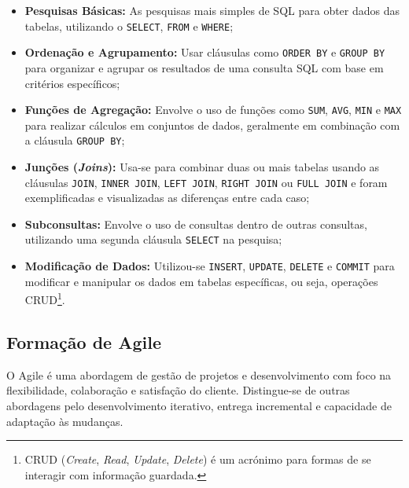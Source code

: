       \begin{itemize}
          \item \textbf{Pesquisas Básicas:} As pesquisas mais simples de SQL para obter dados das tabelas, utilizando o \texttt{SELECT}, \texttt{FROM} e \texttt{WHERE};
          
          \item \textbf{Ordenação e Agrupamento:} Usar cláusulas como \texttt{ORDER BY} e \texttt{GROUP BY} para organizar e agrupar os resultados de uma consulta SQL com base em critérios específicos;
          
          \item \textbf{Funções de Agregação:} Envolve o uso de funções como \texttt{SUM}, \texttt{AVG}, \texttt{MIN} e \texttt{MAX} para realizar cálculos em conjuntos de dados, geralmente em combinação com a cláusula \texttt{GROUP BY};
          
          \item \textbf{Junções (\textit{Joins}):} Usa-se para combinar duas ou mais tabelas usando as cláusulas \texttt{JOIN}, \texttt{INNER JOIN}, \texttt{LEFT JOIN}, \texttt{RIGHT JOIN} ou \texttt{FULL JOIN} e foram exemplificadas e visualizadas as diferenças entre cada caso;
          
          \item \textbf{Subconsultas:} Envolve o uso de consultas dentro de outras consultas, utilizando uma segunda cláusula \texttt{SELECT} na pesquisa;
          
          \item \textbf{Modificação de Dados:} Utilizou-se \texttt{INSERT}, \texttt{UPDATE}, \texttt{DELETE} e \texttt{COMMIT} para modificar e manipular os dados em tabelas específicas, ou seja, operações CRUD\footnote{CRUD (\textit{Create}, \textit{Read}, \textit{Update}, \textit{Delete}) é um acrónimo para formas de se interagir com informação guardada.}.
      \end{itemize}
    
    \subsection{Formação de Agile}\label{subsec:agilescrum}
    
      O Agile é uma abordagem de gestão de projetos e desenvolvimento com foco na flexibilidade, colaboração e satisfação do cliente. Distingue-se de outras abordagens pelo desenvolvimento iterativo, entrega incremental e capacidade de adaptação às mudanças.


